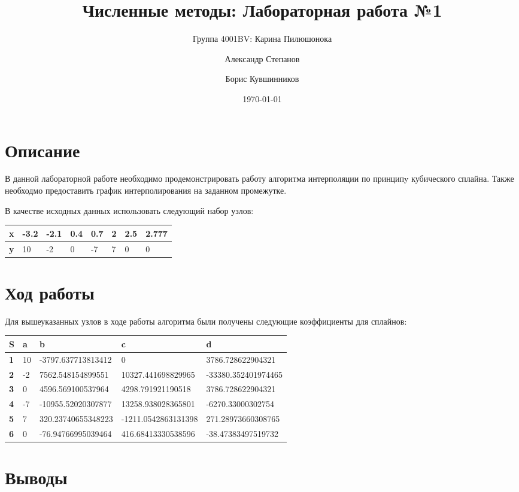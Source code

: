 \documentclass{article}
\title{Численные методы: Лабораторная работа №1}
\author{Группа 4001BV: Карина Пилюшонока \and Александр Степанов \and Борис
Кувшинников}
\date \today
\begin{document}
\maketitle
\newpage
\tableofcontents
\newpage
\section{Описание}
В данной лабораторной работе необходимо продемонстрировать работу алгоритма
интерполяции по принципy кубического сплайна. Также необходмо предоставить
график интерполирования на заданном промежутке.

В качестве исходных данных использовать следующий набор узлов:
\begin{table}[!h]
  \begin{tabular}{|l|l|l|l|l|l|l|l|}
  \hline
  \bfseries x & -3.2 & -2.1 & 0.4 & 0.7 & 2 & 2.5 & 2.777\\
  \hline
  \bfseries y &  10  & -2   & 0   & -7  & 7 & 0   & 0\\
  \hline
  \end{tabular}
\end{table}
\section{Ход работы}
Для вышеуказанных узлов в ходе работы алгоритма были получены следующие
коэффициенты для сплайнов:

\begin{table}[!h]
  \begin{tabular}{|l|l|l|l|l|}
  \hline
  \bfseries S & a & b & c & d \\
  \hline
  \bfseries 1 & 10& -3797.637713813412 & 0 & 3786.728622904321\\
  \bfseries 2 & -2& 7562.548154899551  & 10327.441698829965   & -33380.352401974465\\
  \bfseries 3 & 0 & 4596.569100537964  & 4298.791921190518   & 3786.728622904321\\
  \bfseries 4 & -7& -10955.52020307877 & 13258.938028365801 & -6270.33000302754\\
  \bfseries 5 & 7 & 320.23740655348223 & -1211.0542863131398 & 271.28973660308765\\
  \bfseries 6 & 0 & -76.94766995039464 & 416.68413330538596 & -38.47383497519732\\
  \hline
  \end{tabular}
\end{table}
    
\section{Выводы}
\end{document}
